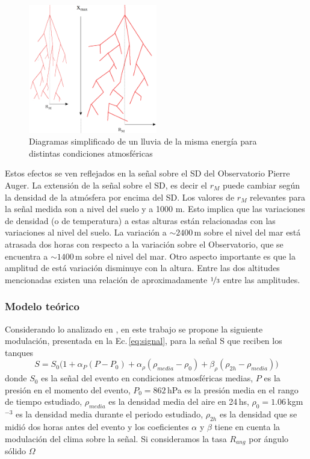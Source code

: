 \begin{figure}[H]
	\centering
	\includegraphics[width=0.5\textwidth]{eas.png}
	\caption{Diagramas simplificado de un lluvia de la misma energía para distintas condiciones atmosféricas}
	\label{fig:eas}
\end{figure}

Estos efectos se ven reflejados en la señal sobre el SD del Observatorio Pierre Auger. La extensión de la señal sobre el SD, es decir el $r_M$ puede cambiar según la densidad de la atmósfera por encima del SD. Los valores de $r_M$ relevantes para la señal medida son a nivel del suelo y a 1000 m. Esto implica que las variaciones de densidad (o de temperatura) a estas alturas están relacionadas con las variaciones al nivel del suelo. La variación a $\sim2400\,$m sobre el nivel del mar está atrasada dos horas con respecto a la variación sobre el Observatorio, que se encuentra a $\sim1400\,$m sobre el nivel del mar. Otro aspecto importante es que la amplitud de está variación disminuye con la altura. Entre las dos altitudes mencionadas existen una relación de aproximadamente $\nicefrac{1}{3}$ entre las amplitudes. 

\subsubsection{Modelo teórico}

Considerando lo analizado en \cite{aab2017impact} \cite{collaboration2009atmospheric}, en este trabajo se propone la siguiente modulación, presentada en la Ec.\,\ref{eq:signal}, para la señal S que reciben los tanques 
\begin{equation}
	S=S_0\big(1+\alpha_P(P-P_0) +\alpha_{\rho}(\rho_{media}-\rho_0) + \beta_{\rho}(\rho_{2h}-\rho_{media})\big)
	\label{eq:signal}
\end{equation}
donde $S_0$ es la señal  del evento en condiciones atmosféricas medias, $P$ es la presión en el momento del evento, $P_0=862\,$hPa es la presión media en el rango de tiempo estudiado, $\rho_{media}$ es la densidad  media del aire en 24\,hs, $\rho_0=1.06\,$kgm$^{-3}$ es la densidad media durante el periodo estudiado, $\rho_{2h}$ es la densidad que se midió dos horas antes del evento  y los coeficientes $\alpha$ y $\beta$ tiene en cuenta la modulación del clima sobre la señal.  Si consideramos la tasa $R_{ang}$  por ángulo sólido $\Omega$

